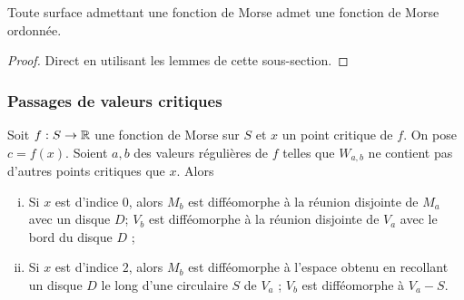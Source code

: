 \begin{thm}
    Toute surface admettant une fonction de Morse admet une fonction de Morse ordonnée.
\end{thm}

\begin{proof}
    Direct en utilisant les lemmes de cette sous-section.
\end{proof}

\subsubsection{Passages de valeurs critiques}

\begin{thm}
    Soit $f:S\to\operatorname{\mathbb R}$ une fonction de Morse sur $S$ et $x$ un point critique de $f$.
    On pose $c=f(x)$. Soient $a,b$ des valeurs régulières de $f$ telles que $W_{a,b}$ ne contient 
    pas d'autres points critiques que $x$.
    Alors 
    \begin{enumerate}[(i)]
        \item Si $x$ est d'indice $0$, alors $M_b$ est difféomorphe à la réunion disjointe de 
        $M_a$ avec un disque $D$; $V_b$ est difféomorphe à la réunion disjointe de $V_a$ avec 
        le bord du disque $D$ ;
        \item Si $x$ est d'indice $2$, alors $M_b$ est difféomorphe à l'espace obtenu en 
        recollant un disque $D$ le long d'une circulaire $S$ de $V_a$ ; $V_b$ est difféomorphe 
        à $V_a-S$.
    \end{enumerate}
\end{thm}

